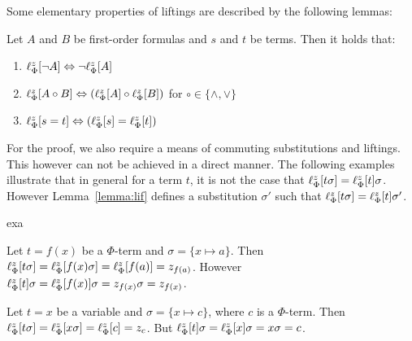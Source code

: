 Some elementary properties of liftings are described by the following lemmas:


\begin{lemma}
	\label{lemma:lift_commute}
	Let $A$ and $B$ be first-order formulas and $s$ and $t$ be terms. Then it holds that:
	\begin{enumerate}
		\item $\lift{\Phi}{\lnot A}{z} \spas\semiff{} \lnot \lift{\Phi}{A}{z}$
		\item $\lift{\Phi}{A \circ B}{z} \spas\semiff{} ( \lift{\Phi}{A}{z} \circ \lift{\Phi}{B}{z} )$ for  $\circ \in \{\land, \lor\}$
		\item $\lift{\Phi}{s = t}{z} \spas\semiff{} ( \lift{\Phi}{s}{z} = \lift{\Phi}{t}{z} )$
	\end{enumerate}
\end{lemma}

For the proof, we also require a means of commuting substitutions and liftings.
This however can not be achieved in a direct manner. The following examples illustrate
that in general for a term $t$, it is not the case that
$
\lft{\Phi}{z}{t\sigma} =
\lft{\Phi}{z}{t}\sigma 
$. However Lemma~\ref{lemma:lif} defines a substitution $\sigma'$ such that 
$
\lft{\Phi}{z}{t\sigma} =
\lft{\Phi}{z}{t}\sigma'
$.

\begin{subtheorem}{exa}
	\begin{exa}
		Let $t = f(x)$ be a $\Phi$-term and $\sigma = \{x \mapsto a\}$.
		Then $\lft{\Phi}{z}{t\sigma} = \lft{\Phi}{z}{f(x)\sigma} = \lft{\Phi}{z}{f(a)} = z_{f(a)}$.
		However $\lft{\Phi}{z}{t}\sigma = \lft{\Phi}{z}{f(x)}\sigma = z_{f(x)}\sigma = z_{f(x)}$.
	\end{exa}
	\begin{exa}
		Let $t=x$ be a variable and $\sigma = \{x\mapsto c\}$, where $c$ is a $\Phi$-term.
		Then $\lft{\Phi}{z}{t\sigma} = 
		\lft{\Phi}{z}{x\sigma} =
		\lft{\Phi}{z}{c} = z_c$.
		But 
		$\lft{\Phi}{z}{t}\sigma = 
		\lft{\Phi}{z}{x}\sigma = 
		x\sigma = 
		c$.
	\end{exa}
\end{subtheorem}


